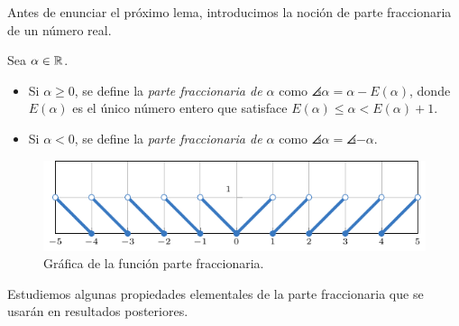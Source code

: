 \documentclass[a4paper, 12pt]{book}
\begin{document}
Antes de enunciar el próximo lema, introducimos la noción de parte fraccionaria de un número real.

\begin{definition}
    Sea $\alpha \in \mathbb R$.
    \begin{itemize}
        \item Si $\alpha \geq 0$, se define la \emph{parte fraccionaria de $\alpha$} como $\angles{\alpha} = \alpha - E(\alpha)$, donde $E(\alpha)$ es el único número entero que satisface $E(\alpha) \leq \alpha < E(\alpha)+1$.
        \item Si $\alpha < 0$, se define la \emph{parte fraccionaria de $\alpha$} como $\angles{\alpha} = \angles{-\alpha}$.
    \end{itemize} 
\end{definition}

\begin{figure}[H]
  \centering
  \includegraphics{./plot15/main.pdf}
  \caption{Gráfica de la función parte fraccionaria.}
\end{figure}

Estudiemos algunas propiedades elementales de la parte fraccionaria que se usarán en resultados posteriores.
\end{document}
